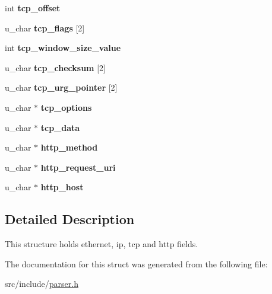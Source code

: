 \begin{DoxyCompactItemize}
\item 
\hypertarget{structframe_ae3271d74ffda00936fba87970548bb19}{}int {\bfseries tcp\+\_\+offset}\label{structframe_ae3271d74ffda00936fba87970548bb19}

\item 
\hypertarget{structframe_abc089c207983823aa575cd80fd49a523}{}u\+\_\+char {\bfseries tcp\+\_\+flags} \mbox{[}2\mbox{]}\label{structframe_abc089c207983823aa575cd80fd49a523}

\item 
\hypertarget{structframe_ad99ef7acf92b46ba71b1209136e10816}{}int {\bfseries tcp\+\_\+window\+\_\+size\+\_\+value}\label{structframe_ad99ef7acf92b46ba71b1209136e10816}

\item 
\hypertarget{structframe_aa59fe9e426c53f8ebf16ac6e41acc6d7}{}u\+\_\+char {\bfseries tcp\+\_\+checksum} \mbox{[}2\mbox{]}\label{structframe_aa59fe9e426c53f8ebf16ac6e41acc6d7}

\item 
\hypertarget{structframe_ab25071300b8ae649d6424dfd36192237}{}u\+\_\+char {\bfseries tcp\+\_\+urg\+\_\+pointer} \mbox{[}2\mbox{]}\label{structframe_ab25071300b8ae649d6424dfd36192237}

\item 
\hypertarget{structframe_a44559d1880f1c465b954ac0fe68c42c8}{}u\+\_\+char $\ast$ {\bfseries tcp\+\_\+options}\label{structframe_a44559d1880f1c465b954ac0fe68c42c8}

\item 
\hypertarget{structframe_acd06a4e764a5ee82b562dd87fcfca7ae}{}u\+\_\+char $\ast$ {\bfseries tcp\+\_\+data}\label{structframe_acd06a4e764a5ee82b562dd87fcfca7ae}

\item 
\hypertarget{structframe_aa3c7250abde611f15ad948b925e21e46}{}u\+\_\+char $\ast$ {\bfseries http\+\_\+method}\label{structframe_aa3c7250abde611f15ad948b925e21e46}

\item 
\hypertarget{structframe_a3a19950676be73e836c7e368fb03d404}{}u\+\_\+char $\ast$ {\bfseries http\+\_\+request\+\_\+uri}\label{structframe_a3a19950676be73e836c7e368fb03d404}

\item 
\hypertarget{structframe_a24c72cc7e124455fa485328cd43f7139}{}u\+\_\+char $\ast$ {\bfseries http\+\_\+host}\label{structframe_a24c72cc7e124455fa485328cd43f7139}

\end{DoxyCompactItemize}


\subsection{Detailed Description}
This structure holds ethernet, ip, tcp and http fields. 

The documentation for this struct was generated from the following file\+:\begin{DoxyCompactItemize}
\item 
src/include/\hyperlink{parser_8h}{parser.\+h}\end{DoxyCompactItemize}
